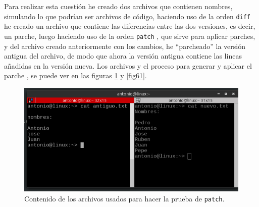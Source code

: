 Para realizar esta cuestión he creado dos archivos que contienen nombres, simulando lo que podrían ser archivos de código, haciendo uso de la orden \texttt{diff} \cite{diff} he creado un archivo que contiene las diferencias entre las dos versiones, es decir, un parche, luego haciendo uso de la orden \texttt{patch} \cite{patch}, que sirve para aplicar parches, y del archivo creado anteriormente con los cambios, he ``parcheado'' la versión antigua del archivo, de modo que ahora  la versión antigua contiene las lineas añadidas en la versión nueva. Los archivos y el proceso para generar y aplicar el parche , se puede ver en las figuras \ref{fig60} y \ref{fig61}.


\begin{figure}[H]
    \begin{center}
        \includegraphics[scale=0.5]{imagenes/img61}
        \caption{Contenido de los archivos usados para hacer la prueba de \texttt{patch}.}
        \label{fig60}
    \end{center}
\end{figure}


